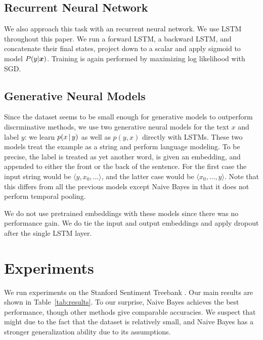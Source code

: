 \documentclass[11pt]{article}
\begin{document}
\subsection{Recurrent Neural Network}
We also approach this task with an recurrent neural network.
We use LSTM \citep{hochreiter1997long} throughout this paper.
We run a forward LSTM, a backward LSTM, and concatenate their final states, project down to a scalar and apply sigmoid to model $P(y|\boldsymbol{x})$.
Training is again performed by maximizing log likelihood with SGD.

\subsection{Generative Neural Models}
Since the dataset seems to be small enough for generative models
to outperform discrminative methods, 
we use two generative neural models for the text $x$ and label $y$:
we learn $p(x\,|\, y)$ as well as $p(y,x)$ directly with LSTMs.
These two models treat the example as a string and perform 
language modeling. To be precise, the label is treated as yet
another word, is given an embedding, and appended to either
the front or the back of the sentence.
For the first case the input string would be
$\langle y, x_0,\ldots \rangle$, and the latter case would be
$\langle x_0, \ldots, y\rangle$. Note that this differs from all the previous models except Naive Bayes in that it does not perform temporal pooling.

We do not use pretrained embeddings with these models since there was no performance gain. We do tie the input and output embeddings and apply dropout after the single LSTM layer.

\section{Experiments}

We run experiments on the Stanford Sentiment Treebank \citep{socher2013recursive}.
Our main results are shown in Table~\ref{tab:results}. 
To our surprise, Naive Bayes achieves the best performance, though other methods give comparable accuracies.
We suspect that might due to the fact that the dataset is relatively small, and Naive Bayes has a stronger generalization ability due to its assumptions.
\end{document}
